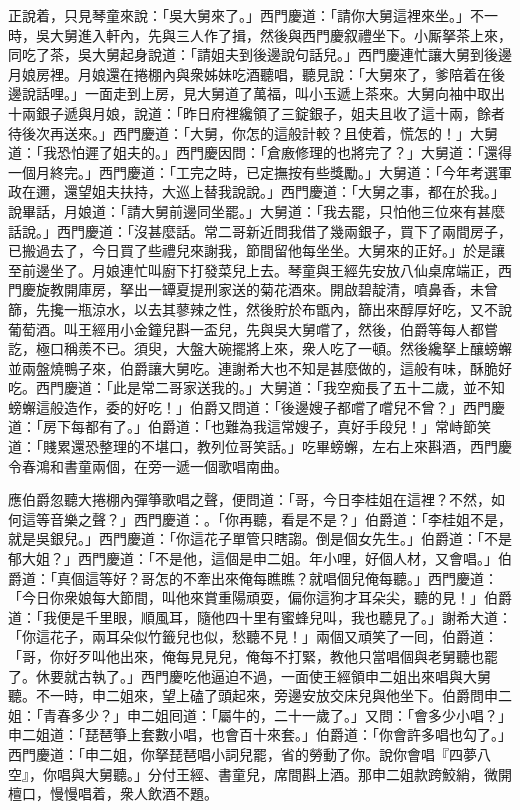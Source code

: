 正說着，只見琴童來說：「吳大舅來了。」西門慶道：「請你大舅這裡來坐。」不一時，吳大舅進入軒內，先與三人作了揖，然後與西門慶叙禮坐下。小厮拏茶上來，同吃了茶，吳大舅起身說道：「請姐夫到後邊說句話兒。」西門慶連忙讓大舅到後邊月娘房裡。月娘還在捲棚內與衆姊妹吃酒聽唱，聽見說：「大舅來了，爹陪着在後邊說話哩。」一面走到上房，見大舅道了萬福，叫小玉遞上茶來。大舅向袖中取出十兩銀子遞與月娘，說道：「昨日府裡纔領了三錠銀子，姐夫且收了這十兩，餘者待後次再送來。」西門慶道：「大舅，你怎的這般計較？且使着，慌怎的！」大舅道：「我恐怕遲了姐夫的。」西門慶因問：「倉廒修理的也將完了？」大舅道：「還得一個月終完。」西門慶道：「工完之時，已定撫按有些獎勵。」大舅道：「今年考選軍政在邇，還望姐夫扶持，大巡上替我說說。」西門慶道：「大舅之事，都在於我。」說畢話，月娘道：「請大舅前邊同坐罷。」大舅道：「我去罷，只怕他三位來有甚麼話說。」西門慶道：「沒甚麼話。常二哥新近問我借了幾兩銀子，買下了兩間房子，已搬過去了，今日買了些禮兒來謝我，節間留他每坐坐。大舅來的正好。」於是讓至前邊坐了。月娘連忙叫廚下打發菜兒上去。琴童與王經先安放八仙桌席端正，西門慶旋教開庫房，拏出一罈夏提刑家送的菊花酒來。開啟碧靛清，噴鼻香，未曾篩，先攙一瓶涼水，以去其蓼辣之性，然後貯於布甑內，篩出來醇厚好吃，又不說葡萄酒。叫王經用小金鐘兒斟一盃兒，先與吳大舅嚐了，然後，伯爵等每人都嘗訖，極口稱羨不已。須臾，大盤大碗擺將上來，衆人吃了一頓。然後纔拏上釀螃蠏並兩盤燒鴨子來，伯爵讓大舅吃。連謝希大也不知是甚麼做的，這般有味，酥脆好吃。西門慶道：「此是常二哥家送我的。」大舅道：「我空痴長了五十二歲，並不知螃蠏這般造作，委的好吃！」伯爵又問道：「後邊嫂子都嚐了嚐兒不曾？」西門慶道：「房下每都有了。」伯爵道：「也難為我這常嫂子，真好手段兒！」常峙節笑道：「賤累還恐整理的不堪口，教列位哥笑話。」吃畢螃蠏，左右上來斟酒，西門慶令春鴻和書童兩個，在旁一遞一個歌唱南曲。

應伯爵忽聽大捲棚內彈箏歌唱之聲，便問道：「哥，今日李桂姐在這裡？不然，如何這等音樂之聲？」西門慶道：。「你再聽，看是不是？」伯爵道：「李桂姐不是，就是吳銀兒。」西門慶道：「你這花子單管只瞎謅。倒是個女先生。」伯爵道：「不是郁大姐？」西門慶道：「不是他，這個是申二姐。年小哩，好個人材，又會唱。」伯爵道：「真個這等好？哥怎的不牽出來俺每瞧瞧？就唱個兒俺每聽。」西門慶道：「今日你衆娘每大節間，叫他來賞重陽頑耍，偏你這狗才耳朵尖，聽的見！」伯爵道：「我便是千里眼，順風耳，隨他四十里有蜜蜂兒叫，我也聽見了。」謝希大道：「你這花子，兩耳朵似竹籤兒也似，愁聽不見！」兩個又頑笑了一囘，伯爵道：「哥，你好歹叫他出來，俺每見見兒，俺每不打緊，教他只當唱個與老舅聽也罷了。休要就古執了。」西門慶吃他逼迫不過，一面使王經領申二姐出來唱與大舅聽。不一時，申二姐來，望上磕了頭起來，旁邊安放交床兒與他坐下。伯爵問申二姐：「青春多少？」申二姐囘道：「屬牛的，二十一歲了。」又問：「會多少小唱？」申二姐道：「琵琶箏上套數小唱，也會百十來套。」伯爵道：「你會許多唱也勾了。」西門慶道：「申二姐，你拏琵琶唱小詞兒罷，省的勞動了你。說你會唱『四夢八空』，你唱與大舅聽。」分付王經、書童兒，席間斟上酒。那申二姐款跨鮫綃，微開檀口，慢慢唱着，衆人飲酒不題。

